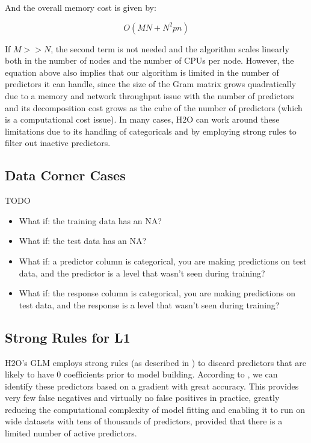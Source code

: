 And the overall memory cost is given by:

\[ O(MN + N^2pn)\]

If $M >> N$, the second term is not needed and the algorithm scales linearly both in the number of nodes and the
number of CPUs per node. However, the equation above also implies that our algorithm is limited in the number of
predictors it can handle, since the size of the Gram matrix grows quadratically due to a memory and network
throughput issue with the number of predictors and its decomposition cost grows as the cube of the number of
predictors (which is a computational cost issue). In many cases, H2O can work around these limitations due to its
handling of categoricals and by employing strong rules to filter out inactive predictors.

\subsection{Data Corner Cases}

TODO

\begin{itemize}
\item What if: the training data has an NA?

\item What if: the test data has an NA?

\item What if: a predictor column is categorical, you are making predictions on test data, and the predictor is
a level that wasn't seen during training?

\item What if: the response column is categorical, you are making predictions on test data, and the response is
a level that wasn't seen during training?
\end{itemize}

\subsection{Strong Rules for L1} \label{strongrules}

H2O's GLM employs strong rules (as described in ) to discard predictors that are likely to have
0 coefficients prior to model building. According to , we can identify these predictors based on
a gradient with great accuracy. This provides very few false negatives and virtually no false positives in
practice, greatly reducing the computational complexity of model fitting and enabling it to run on wide datasets
with tens of thousands of predictors, provided that there is a limited number of active predictors.

